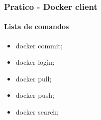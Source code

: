 \begin{frame}
	\frametitle{Pratico - Docker client}
	\framesubtitle{Lista de comandos}
	\begin{itemize}
		\item docker commit;
		\item docker login;
		\item docker pull;
		\item docker push;
		\item docker search;
	\end{itemize}
\end{frame}

